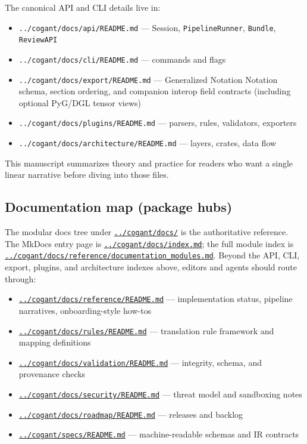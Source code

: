\documentclass[
]{article}
\providecommand{\tightlist}{%
  \setlength{\itemsep}{0pt}\setlength{\parskip}{0pt}}
\begin{document}
The canonical API and CLI details live in:

\begin{itemize}
\tightlist
\item
  \texttt{../cogant/docs/api/README.md} --- Session,
  \texttt{PipelineRunner}, \texttt{Bundle}, \texttt{ReviewAPI}
\item
  \texttt{../cogant/docs/cli/README.md} --- commands and flags
\item
  \texttt{../cogant/docs/export/README.md} --- Generalized Notation
  Notation schema, section ordering, and companion interop field
  contracts (including optional PyG/DGL tensor views)
\item
  \texttt{../cogant/docs/plugins/README.md} --- parsers, rules,
  validators, exporters
\item
  \texttt{../cogant/docs/architecture/README.md} --- layers, crates,
  data flow
\end{itemize}

This manuscript summarizes theory and practice for readers who want a
single linear narrative before diving into those files.

\subsection{Documentation map (package
hubs)}\label{documentation-map-package-hubs}

The modular docs tree under
\href{../cogant/docs/}{\texttt{../cogant/docs/}} is the authoritative
reference. The MkDocs entry page is
\href{../cogant/docs/index.md}{\texttt{../cogant/docs/index.md}}; the
full module index is
\href{../cogant/docs/reference/documentation_modules.md}{\texttt{../cogant/docs/reference/documentation\_modules.md}}.
Beyond the API, CLI, export, plugins, and architecture indexes above,
editors and agents should route through:

\begin{itemize}
\tightlist
\item
  \href{../cogant/docs/reference/README.md}{\texttt{../cogant/docs/reference/README.md}}
  --- implementation status, pipeline narratives, onboarding-style
  how-tos
\item
  \href{../cogant/docs/rules/README.md}{\texttt{../cogant/docs/rules/README.md}}
  --- translation rule framework and mapping definitions
\item
  \href{../cogant/docs/validation/README.md}{\texttt{../cogant/docs/validation/README.md}}
  --- integrity, schema, and provenance checks
\item
  \href{../cogant/docs/security/README.md}{\texttt{../cogant/docs/security/README.md}}
  --- threat model and sandboxing notes
\item
  \href{../cogant/docs/roadmap/README.md}{\texttt{../cogant/docs/roadmap/README.md}}
  --- releases and backlog
\item
  \href{../cogant/specs/README.md}{\texttt{../cogant/specs/README.md}}
  --- machine-readable schemas and IR contracts
\end{itemize}
\end{document}
